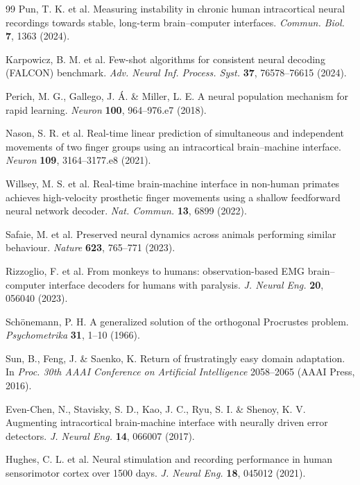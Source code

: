 \begin{thebibliography}{99}
 Pun, T. K. et al. Measuring instability in chronic human intracortical neural recordings towards stable, long-term brain--computer interfaces. \textit{Commun. Biol.} \textbf{7}, 1363 (2024).

 Karpowicz, B. M. et al. Few-shot algorithms for consistent neural decoding (FALCON) benchmark. \textit{Adv. Neural Inf. Process. Syst.} \textbf{37}, 76578--76615 (2024).

 Perich, M. G., Gallego, J. {\'A}. \& Miller, L. E. A neural population mechanism for rapid learning. \textit{Neuron} \textbf{100}, 964--976.e7 (2018).

 Nason, S. R. et al. Real-time linear prediction of simultaneous and independent movements of two finger groups using an intracortical brain--machine interface. \textit{Neuron} \textbf{109}, 3164--3177.e8 (2021).

 Willsey, M. S. et al. Real-time brain-machine interface in non-human primates achieves high-velocity prosthetic finger movements using a shallow feedforward neural network decoder. \textit{Nat. Commun.} \textbf{13}, 6899 (2022).

 Safaie, M. et al. Preserved neural dynamics across animals performing similar behaviour. \textit{Nature} \textbf{623}, 765--771 (2023).

 Rizzoglio, F. et al. From monkeys to humans: observation-based EMG brain--computer interface decoders for humans with paralysis. \textit{J. Neural Eng.} \textbf{20}, 056040 (2023).

 Sch{\"o}nemann, P. H. A generalized solution of the orthogonal Procrustes problem. \textit{Psychometrika} \textbf{31}, 1--10 (1966).

 Sun, B., Feng, J. \& Saenko, K. Return of frustratingly easy domain adaptation. In \textit{Proc. 30th AAAI Conference on Artificial Intelligence} 2058--2065 (AAAI Press, 2016).

 Even-Chen, N., Stavisky, S. D., Kao, J. C., Ryu, S. I. \& Shenoy, K. V. Augmenting intracortical brain-machine interface with neurally driven error detectors. \textit{J. Neural Eng.} \textbf{14}, 066007 (2017).

 Hughes, C. L. et al. Neural stimulation and recording performance in human sensorimotor cortex over 1500 days. \textit{J. Neural Eng.} \textbf{18}, 045012 (2021).


\end{thebibliography}
